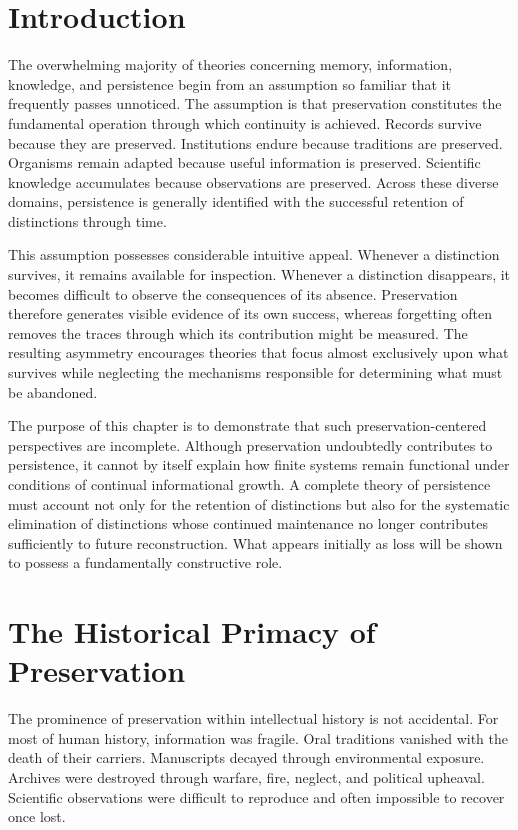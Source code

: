 \documentclass[12pt,oneside]{book}
\theoremstyle{plain} \newtheorem{theorem}{Theorem}[chapter] \newtheorem{lemma}[theorem]{Lemma} \newtheorem{proposition}[theorem]{Proposition} \newtheorem{corollary}[theorem]{Corollary}
\theoremstyle{definition} \newtheorem{definition}[theorem]{Definition} \newtheorem{axiom}[theorem]{Axiom} \newtheorem{construction}[theorem]{Construction}
\theoremstyle{remark} \newtheorem{remark}[theorem]{Remark} \newtheorem{example}[theorem]{Example}
\begin{document}
\section{Introduction}

The overwhelming majority of theories concerning memory, information, knowledge, and persistence begin from an assumption so familiar that it frequently passes unnoticed. The assumption is that preservation constitutes the fundamental operation through which continuity is achieved. Records survive because they are preserved. Institutions endure because traditions are preserved. Organisms remain adapted because useful information is preserved. Scientific knowledge accumulates because observations are preserved. Across these diverse domains, persistence is generally identified with the successful retention of distinctions through time.

This assumption possesses considerable intuitive appeal. Whenever a distinction survives, it remains available for inspection. Whenever a distinction disappears, it becomes difficult to observe the consequences of its absence. Preservation therefore generates visible evidence of its own success, whereas forgetting often removes the traces through which its contribution might be measured. The resulting asymmetry encourages theories that focus almost exclusively upon what survives while neglecting the mechanisms responsible for determining what must be abandoned.

The purpose of this chapter is to demonstrate that such preservation-centered perspectives are incomplete. Although preservation undoubtedly contributes to persistence, it cannot by itself explain how finite systems remain functional under conditions of continual informational growth. A complete theory of persistence must account not only for the retention of distinctions but also for the systematic elimination of distinctions whose continued maintenance no longer contributes sufficiently to future reconstruction. What appears initially as loss will be shown to possess a fundamentally constructive role.

\section{The Historical Primacy of Preservation}

The prominence of preservation within intellectual history is not accidental. For most of human history, information was fragile. Oral traditions vanished with the death of their carriers. Manuscripts decayed through environmental exposure. Archives were destroyed through warfare, fire, neglect, and political upheaval. Scientific observations were difficult to reproduce and often impossible to recover once lost.
\end{document}
